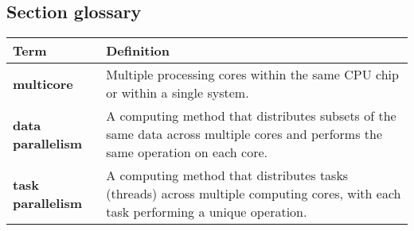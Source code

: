 \subsection*{Section glossary}
\centering
\begin{tabular}{>{\raggedright}p{} >{\raggedright\arraybackslash}p{}}
\toprule
\textbf{Term} & \textbf{Definition} \\
\midrule
\textbf{multicore} & Multiple processing cores within the same CPU chip or within a single system. \\
\textbf{data parallelism} & A computing method that distributes subsets of the same data across multiple cores and performs the same operation on each core. \\
\textbf{task parallelism} & A computing method that distributes tasks (threads) across multiple computing cores, with each task performing a unique operation. \\
\bottomrule
\end{tabular}
\vspace{\baselineskip}
